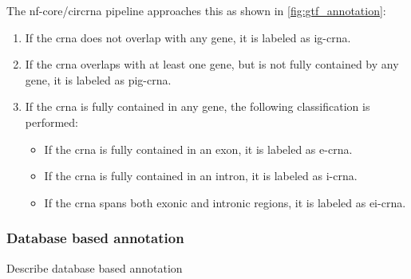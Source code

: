 The nf-core/circrna pipeline approaches this as shown in
\cref{fig:gtf_annotation}: \begin{enumerate} \item If the \gls{crna} does not
          overlap with any gene, it is labeled as \gls{ig-crna}.
    \item If the \gls{crna} overlaps with at least one gene, but is not fully
          contained by any gene, it is labeled as \gls{pig-crna}.
    \item If the \gls{crna} is fully contained in any gene, the following
          classification is performed:
          \begin{itemize}
              \item If the \gls{crna} is fully contained in an exon, it is
                    labeled as \gls{e-crna}.
              \item If the \gls{crna} is fully contained in an intron, it is
                    labeled as \gls{i-crna}.
              \item If the \gls{crna} spans both exonic and intronic regions,
                    it is labeled as \gls{ei-crna}.
          \end{itemize}
\end{enumerate}

\subsubsection{Database based annotation} Describe database based annotation